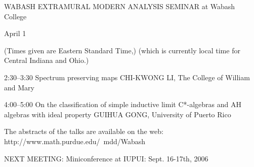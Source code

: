              WABASH
  EXTRAMURAL MODERN ANALYSIS
            SEMINAR
       at Wabash College

           April 1


(Times given are Eastern Standard Time,) (which is currently local time for
Central Indiana and Ohio.)


2:30--3:30  Spectrum preserving maps
              CHI-KWONG LI, The College of William and Mary

4:00--5:00  On the classification of simple inductive limit C*-algebras and AH
algebras with ideal property
              GUIHUA GONG,  University of Puerto Rico

The abstracts of the talks are available on the web:
http://www.math.purdue.edu/~mdd/Wabash

NEXT MEETING: Miniconference at IUPUI: Sept. 16-17th, 2006
